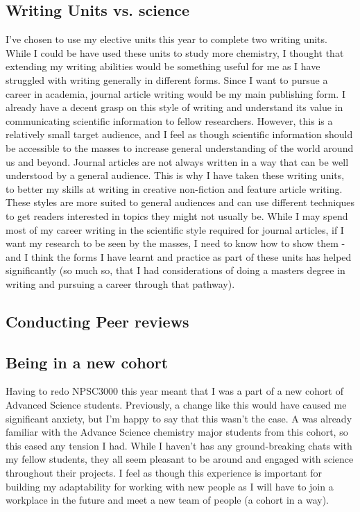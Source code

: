 \documentclass[11pt]{article}
\begin{document}
\subsection{Writing Units vs. science}

I've chosen to use my elective units this year to complete two writing units. While I could be have used these units to study more chemistry, I thought that extending my writing abilities would be something useful for me as I have struggled with writing generally in different forms. Since I want to pursue a career in academia, journal article writing would be my main publishing form. I already have a decent grasp on this style of writing and understand its value in communicating scientific information to fellow researchers. However, this is a relatively small target audience, and I feel as though scientific information should be accessible to the masses to increase general understanding of the world around us and beyond. Journal articles are not always written in a way that can be well understood by a general audience. This is why I have taken these writing units, to better my skills at writing in creative non-fiction and feature article writing. These styles are more suited to general audiences and can use different techniques to get readers interested in topics they might not usually be. While I may spend most of my career writing in the scientific style required for journal articles, if I want my research to be seen by the masses, I need to know how to show them - and I think the forms I have learnt and practice as part of these units has helped significantly (so much so, that I had considerations of doing a masters degree in writing and pursuing a career through that pathway).

\subsection{Conducting Peer reviews}
\subsection{Being in a new cohort}

Having to redo NPSC3000 this year meant that I was a part of a new cohort of Advanced Science students. Previously, a change like this would have caused me significant anxiety, but I'm happy to say that this wasn't the case. A was already familiar with the Advance Science chemistry major students from this cohort, so this eased any tension I had. While I haven't has any ground-breaking chats with my fellow students, they all seem pleasant to be around and engaged with science throughout their projects. I feel as though this experience is important for building my adaptability for working with new people as I will have to join a workplace in the future and meet a new team of people (a cohort in a way).
\end{document}
